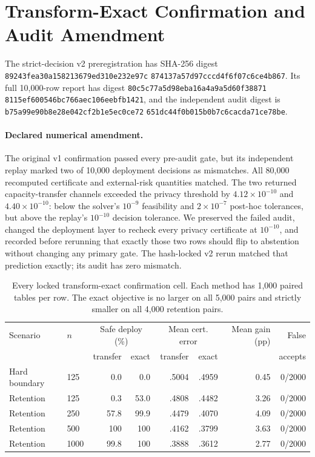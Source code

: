 \section{Transform-Exact Confirmation and Audit Amendment}

\begingroup\raggedright
The strict-decision v2 preregistration has SHA-256 digest
\texttt{89243fea30a158213679ed310e232e97c}\allowbreak
\texttt{874137a57d97cccd4f6f07c6ce4b867}. Its full 10,000-row report has digest
\texttt{80c5c77a5d98eba16a4a9a5d60f38871}\allowbreak
\texttt{8115ef600546bc766aec106eebfb1421}, and the independent audit digest is
\texttt{b75a99e90b8e28e042cf2b1e5ec0ce72}\allowbreak
\texttt{651dc44f0b015b0b7c6cacda71ce78be}.\par
\endgroup

\paragraph{Declared numerical amendment.}
The original v1 confirmation passed every pre-audit gate, but its independent
replay marked two of 10,000 deployment decisions as mismatches. All 80,000
recomputed certificate and external-risk quantities matched. The two returned
capacity-transfer channels exceeded the privacy threshold by
$4.12\times10^{-10}$ and $4.40\times10^{-10}$: below the solver's $10^{-9}$
feasibility and $2\times10^{-7}$ post-hoc tolerances, but above the replay's
$10^{-10}$ decision tolerance. We preserved the failed audit, changed the
deployment layer to recheck every privacy certificate at $10^{-10}$, and
recorded before rerunning that exactly those two rows should flip to abstention
without changing any primary gate. The hash-locked v2 rerun matched that
prediction exactly; its audit has zero mismatch.

\begin{table}[t]
\centering
\small
\setlength{\tabcolsep}{4.2pt}
\begin{tabular}{llrrrrrr}
\hline
Scenario & $n$ & \multicolumn{2}{c}{Safe deploy (\%)} &
\multicolumn{2}{c}{Mean cert. error} & Mean gain (pp) & False \\
&& transfer & exact & transfer & exact && accepts \\
\hline
Hard boundary & 125 & 0.0 & 0.0 & .5004 & .4959 & 0.45 & 0/2000 \\
Retention & 125 & 0.3 & 53.0 & .4808 & .4482 & 3.26 & 0/2000 \\
Retention & 250 & 57.8 & 99.9 & .4479 & .4070 & 4.09 & 0/2000 \\
Retention & 500 & 100 & 100 & .4162 & .3799 & 3.63 & 0/2000 \\
Retention & 1000 & 99.8 & 100 & .3888 & .3612 & 2.77 & 0/2000 \\
\hline
\end{tabular}
\caption{Every locked transform-exact confirmation cell. Each method has 1,000
paired tables per row. The exact objective is no larger on all 5,000 pairs and
strictly smaller on all 4,000 retention pairs.}
\label{supp:tab:exactcells}
\end{table}

